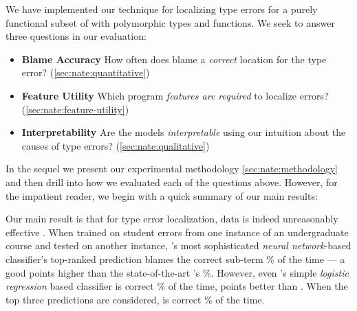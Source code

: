 \label{sec:nate:evaluation}


We have implemented our technique for localizing type errors for a
purely functional subset of \ocaml with polymorphic types and functions.
%
We seek to answer three questions in our evaluation:
%
\begin{itemize}
\item \textbf{Blame Accuracy}
  How often does \toolname
  blame a \emph{correct}
  location for the type error?
  (\autoref{sec:nate:quantitative})
\item \textbf{Feature Utility}
  Which program \emph{features are required}
  to localize errors?
   (\autoref{sec:nate:feature-utility})
\item \textbf{Interpretability}
  Are the models \emph{interpretable} using
  our intuition about the causes of type errors?
  (\autoref{sec:nate:qualitative})
\end{itemize}
%
%
In the sequel we present our experimental
methodology \autoref{sec:nate:methodology} and
then drill into how we evaluated each of
the questions above.
%
However, for the impatient reader, we begin
with a quick summary of our main results:
%
%
%

Our main result is that for type error
localization, data is indeed unreasonably
effective \citep{Halevy2009-so}.
%
When trained on student errors from one
instance of an undergraduate course and
tested on another instance,
\toolname's most sophisticated
\emph{neural network}-based
classifier's top-ranked
prediction blames the correct
sub-term \HiddenFhTopOne\% of the time
--- a good \ToolnameWinSherrloc points
higher than the state-of-the-art
\sherrloc's \SherrlocTopOne\%.
%
However, even \toolname's simple
\emph{logistic regression} based
classifier is correct \LinearTopOne\% of the time,
\ie \LinearWinSherrloc points better than \sherrloc.
%
When the top three predictions are considered,
\toolname is correct \HiddenFhTopThree\% of the time.

